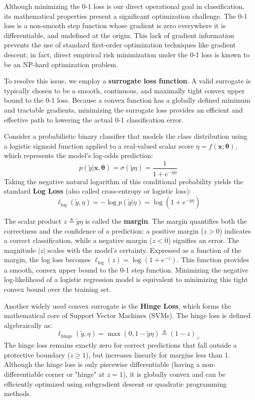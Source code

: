 \documentclass{article}
\begin{document}
Although minimizing the 0-1 loss is our direct operational goal in classification, its mathematical properties present a significant optimization challenge. The 0-1 loss is a non-smooth step function whose gradient is zero everywhere it is differentiable, and undefined at the origin. This lack of gradient information prevents the use of standard first-order optimization techniques like gradient descent; in fact, direct empirical risk minimization under the 0-1 loss is known to be an NP-hard optimization problem.

To resolve this issue, we employ a \textbf{surrogate loss function}. A valid surrogate is typically chosen to be a smooth, continuous, and maximally tight convex upper bound to the 0-1 loss. Because a convex function has a globally defined minimum and tractable gradients, minimizing the surrogate loss provides an efficient and effective path to lowering the actual 0-1 classification error.

Consider a probabilistic binary classifier that models the class distribution using a logistic sigmoid function applied to a real-valued scalar score $\eta = f(\mathbf{x}; \boldsymbol{\theta})$, which represents the model's log-odds prediction:
\begin{equation}
p(\tilde{y} | \mathbf{x}, \boldsymbol{\theta}) = \sigma(\tilde{y}\eta) = \frac{1}{1 + e^{-\tilde{y}\eta}}
\end{equation}
Taking the negative natural logarithm of this conditional probability yields the standard \textbf{Log Loss} (also called cross-entropy or logistic loss):
\begin{equation}
\ell_{\text{log}}(\tilde{y}, \eta) = -\log p(\tilde{y} | \eta) = \log\left(1 + e^{-\tilde{y}\eta}\right)
\end{equation}

The scalar product $z \triangleq \tilde{y}\eta$ is called the \textbf{margin}. The margin quantifies both the correctness and the confidence of a prediction: a positive margin ($z > 0$) indicates a correct classification, while a negative margin ($z < 0$) signifies an error. The magnitude $|z|$ scales with the model's certainty. Expressed as a function of the margin, the log loss becomes $\ell_{\text{log}}(z) = \log(1 + e^{-z})$. This function provides a smooth, convex upper bound to the 0-1 step function. Minimizing the negative log-likelihood of a logistic regression model is equivalent to minimizing this tight convex bound over the training set.

Another widely used convex surrogate is the \textbf{Hinge Loss}, which forms the mathematical core of Support Vector Machines (SVMs). The hinge loss is defined algebraically as:
\begin{equation}
\ell_{\text{hinge}}(\tilde{y}, \eta) = \max(0, 1 - \tilde{y}\eta) \triangleq (1 - z)_+
\end{equation}
The hinge loss remains exactly zero for correct predictions that fall outside a protective boundary ($z \geq 1$), but increases linearly for margins less than 1. Although the hinge loss is only piecewise differentiable (having a non-differentiable corner or "hinge" at $z = 1$), it is globally convex and can be efficiently optimized using subgradient descent or quadratic programming methods.
\end{document}

